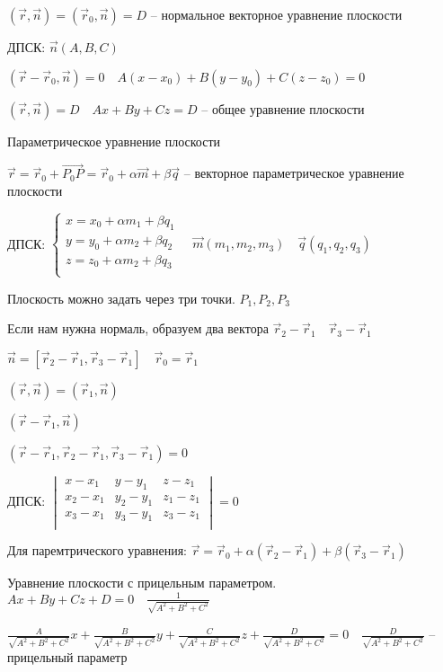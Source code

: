 \documentclass{book}
\theoremstyle{definition}
\newcommand\vect[1]{\overset{\longrightarrow}{#1}}
\begin{document}
$\left( \vec r , \vec n \right) = \left( \vec r_0, \vec n \right) =D $ -- нормальное векторное уравнение плоскости

ДПСК: $\vec n(A,B,C)$

$\left( \vec r-\vec r_0, \vec n \right) = 0\quad A(x-x_0) + B(y-y_0) + C(z-z_0) = 0 $

$\left( \vec r, \vec n \right)  = D\quad Ax+By+Cz=D$ -- общее уравнение плоскости

Параметрическое уравнение плоскости

$\vec r = \vec r_0 + \vect{P_0P} = \vec r_0 + \alpha\vec m + \beta \vec q$ -- векторное параметрическое уравнение плоскости

ДПСК: $\begin{cases}
    x = x_0+\alpha m_1+\beta q_1\\
    y = y_0+\alpha m_2 + \beta q_2\\
    z = z_0+\alpha m_2 + \beta q_3\\
\end{cases}\quad \vec m(m_1, m_2, m_3)\quad \vec q(q_1, q_2, q_3)$

Плоскость можно задать через три точки. $P_1, P_2, P_3$

Если нам нужна нормаль, образуем два вектора $\vec r_2-\vec r_1\quad \vec r_3 - \vec r_1$

$\vec n = \left[ \vec r_2-\vec r_1, \vec r_3-\vec r_1 \right]\quad \vec r_0 = \vec r_1 $ 

$(\vec r, \vec n) = (\vec r_1, \vec n)$

$\left( \vec r-\vec r_1, \vec n \right) $

$\left( \vec r-\vec r_1, \vec r_2-\vec r_1, \vec r_3-\vec r_1 \right) = 0$ 

ДПСК:  $
\begin{vmatrix}
    x-x_1&y-y_1&z-z_1\\
    x_2-x_1&y_2-y_1&z_1-z_1\\
    x_3-x_1&y_3-y_1&z_3-z_1\\
\end{vmatrix} = 0$

Для паремтрического уравнения: $\vec r = \vec r_0 + \alpha \left( \vec r_2-\vec r_1 \right)  + \beta \left( \vec r_3-\vec r_1 \right) $ 

Уравнение плоскости с прицельным параметром. $Ax+By+Cz+D = 0\quad \frac{1}{\sqrt{A^2+B^2+C^2} }$ 

$\frac{A}{\sqrt{A^2+B^2+C^2} }x + \frac{B}{\sqrt{A^2+B^2+C^2} }y + \frac{C}{\sqrt{A^2+B^2+C^2} }z + \frac{D}{\sqrt{A^2+B^2+C^2} } = 0\quad \frac{D}{\sqrt{A^2+B^2+C^2} }$ -- прицельный параметр
\end{document}
